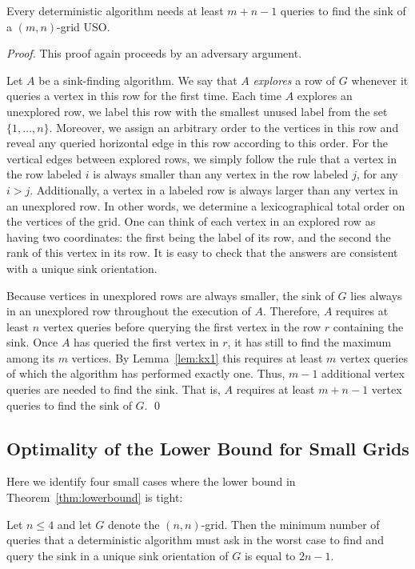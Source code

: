 \documentclass[runningheads,a4paper]{llncs}
\begin{document}
\begin{theorem} \label{thm:lowerbound}
Every deterministic algorithm needs at least $m+n-1$ queries to find the sink of a $(m,n)$-grid USO. 
\end{theorem}
\begin{proof}
    This proof again proceeds by an adversary argument.

Let $A$ be a sink-finding algorithm. We say that $A$ \emph{explores} a row of $G$ whenever it queries a vertex in this row for the first time.
Each time $A$ explores an unexplored row, we label this row with the smallest unused label from the set $\{1, \ldots, n\}$. Moreover, we assign an arbitrary order to the vertices in this row and reveal any queried horizontal edge in this row according to this order. For the vertical edges between explored rows, we simply follow the rule that a vertex in the row labeled $i$ is always smaller than any vertex in the row labeled $j$, for any $i > j$. Additionally, a vertex in a labeled row is always larger than any vertex in an unexplored row. In other words, we determine a lexicographical total order on the vertices of the grid. One can think of each vertex in an explored row as having two coordinates: the first being the label of its row, and the second the rank of this vertex in its row.
It is easy to check that the answers are consistent with a unique sink orientation.

Because vertices in unexplored rows are always smaller, the sink of $G$ lies always in an unexplored row throughout the execution of $A$. Therefore, $A$ requires at least $n$ vertex queries before querying the first vertex in the row $r$ containing the sink. Once $A$ has queried the first vertex in $r$, it has still to find the maximum among its $m$ vertices. 
By Lemma~\ref{lem:kx1} this requires at least $m$ vertex queries of which the algorithm has performed exactly one. Thus, $m-1$ additional vertex queries are needed to find the sink. That is, $A$ requires at least $m+n-1$ vertex queries to find the sink of $G$. \qed
\end{proof}


\subsection{Optimality of the Lower Bound for Small Grids}

Here we identify four small cases where the lower bound in
Theorem~\ref{thm:lowerbound} is tight:
\begin{theorem}
    \label{thm:smallGrids}
    Let $n \le 4$ and let $G$ denote the $(n,n)$-grid. Then the minimum number
    of queries that a deterministic algorithm must ask in the worst case to
    find and query the sink in a unique sink orientation of $G$ is equal to
    $2n-1$.
\end{theorem}
\end{document}
